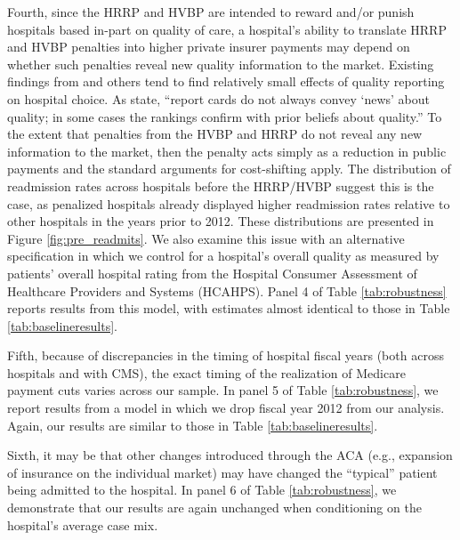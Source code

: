 \documentclass[12pt]{article}
\begin{document}
Fourth, since the HRRP and HVBP are intended to reward and/or punish hospitals based in-part on quality of care, a hospital's ability to translate HRRP and HVBP penalties into higher private insurer payments may depend on whether such penalties reveal new quality information to the market. Existing findings from \cite{dranove2008} and others tend to find relatively small effects of quality reporting on hospital choice. As \cite{dranove2008} state, ``report cards do not always convey `news' about quality; in some cases the rankings confirm with prior beliefs about quality.'' To the extent that penalties from the HVBP and HRRP do not reveal any new information to the market, then the penalty acts simply as a reduction in public payments and the standard arguments for cost-shifting apply. The distribution of readmission rates across hospitals before the HRRP/HVBP suggest this is the case, as penalized hospitals already displayed higher readmission rates relative to other hospitals in the years prior to 2012. These distributions are presented in Figure \ref{fig:pre_readmits}. We also examine this issue with an alternative specification in which we control for a hospital's overall quality as measured by patients' overall hospital rating from the Hospital Consumer Assessment of Healthcare Providers and Systems (HCAHPS).  Panel 4 of Table \ref{tab:robustness} reports results from this model, with estimates almost identical to those in Table \ref{tab:baselineresults}.

Fifth, because of discrepancies in the timing of hospital fiscal years (both across hospitals and with CMS), the exact timing of the realization of Medicare payment cuts varies across our sample. In panel 5 of Table \ref{tab:robustness}, we report results from a model in which we drop fiscal year 2012 from our analysis. Again, our results are similar to those in Table \ref{tab:baselineresults}.

Sixth, it may be that other changes introduced through the ACA (e.g., expansion of insurance on the individual market) may have changed the ``typical'' patient being admitted to the hospital. In panel 6 of Table \ref{tab:robustness}, we demonstrate that our results are again unchanged when conditioning on the hospital's average case mix.
\end{document}

